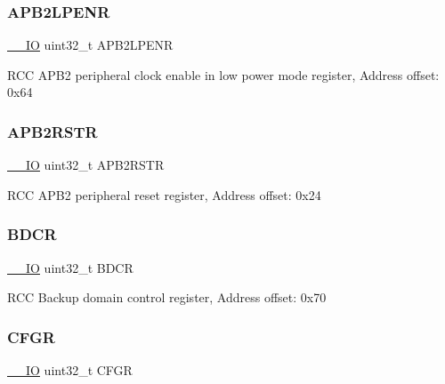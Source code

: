 \subsubsection{\texorpdfstring{A\+P\+B2\+L\+P\+E\+NR}{APB2LPENR}}
{\footnotesize\ttfamily \mbox{\hyperlink{core__sc300_8h_aec43007d9998a0a0e01faede4133d6be}{\+\_\+\+\_\+\+IO}} uint32\+\_\+t A\+P\+B2\+L\+P\+E\+NR}

R\+CC A\+P\+B2 peripheral clock enable in low power mode register, Address offset\+: 0x64 \mbox{\label{struct_r_c_c___type_def_ab2c5389c9ff4ac188cd498b8f7170968}} 
\subsubsection{\texorpdfstring{A\+P\+B2\+R\+S\+TR}{APB2RSTR}}
{\footnotesize\ttfamily \mbox{\hyperlink{core__sc300_8h_aec43007d9998a0a0e01faede4133d6be}{\+\_\+\+\_\+\+IO}} uint32\+\_\+t A\+P\+B2\+R\+S\+TR}

R\+CC A\+P\+B2 peripheral reset register, Address offset\+: 0x24 \mbox{\label{struct_r_c_c___type_def_a0b9a3ced775287c8585a6a61af4b40e9}} 
\subsubsection{\texorpdfstring{B\+D\+CR}{BDCR}}
{\footnotesize\ttfamily \mbox{\hyperlink{core__sc300_8h_aec43007d9998a0a0e01faede4133d6be}{\+\_\+\+\_\+\+IO}} uint32\+\_\+t B\+D\+CR}

R\+CC Backup domain control register, Address offset\+: 0x70 \mbox{\label{struct_r_c_c___type_def_a26f1e746ccbf9c9f67e7c60e61085ec1}} 
\subsubsection{\texorpdfstring{C\+F\+GR}{CFGR}}
{\footnotesize\ttfamily \mbox{\hyperlink{core__sc300_8h_aec43007d9998a0a0e01faede4133d6be}{\+\_\+\+\_\+\+IO}} uint32\+\_\+t C\+F\+GR}

